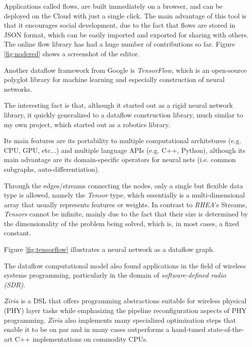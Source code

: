 \documentclass{dithesis}
\begin{document}
Applications called flows, are built immediately on a browser, and can be deployed on the Cloud with just a single click. The main advantage of this tool is that it encourages social development, due to the fact that flows are stored in JSON format, which can be easily imported and exported for sharing with others. The online flow library has had a huge number of contributions so far. Figure \ref{fig:nodered} shows a screenshot of the editor.




Another dataflow framework from Google is \textit{TensorFlow}\cite{tensor_flow}, which is an open-source polyglot library for machine learning and especially construction of neural networks.

The interesting fact is that, although it started out as a rigid neural network library, it quickly generalized to a dataflow construction library, much similar to my own project, which started out as a robotics library. 

Its main features are its portability to multiple computational architetures (e.g. CPU, GPU, etc...) and multiple language APIs (e.g. C++, Python), although its main advantage are its domain-specific operators for neural nets (i.e. common subgraphs, auto-differentiation).

Through the edges/streams connecting the nodes, only a single but flexible data type is allowed, namely the \textit{Tensor} type, which essentially is a multi-dimensional array that usually represents features or weights. In contrast to \textit{RHEA}'s Streams, \textit{Tensors} cannot be infinite, mainly due to the fact that their size is determined by the dimensionality of the problem being solved, which is, in most cases, a fixed constant.

Figure \ref{fig:tensorflow} illustrates a neural network as a dataflow graph.



The dataflow computational model also found applications in the field of wireless systems programming, particularly in the domain of \textit{software-defined radio (SDR)}. 

\textit{Ziria}\cite{ziria} is a DSL that offers programming abstractions suitable for wireless physical (PHY) layer tasks while emphasizing the pipeline reconfiguration aspects of PHY programming. \textit{Ziria} also implements many specialized optimization steps that enable it to be on par and in many cases outperforms a hand-tuned state-of-the-art C++ implementations on commodity CPUs.
\end{document}
